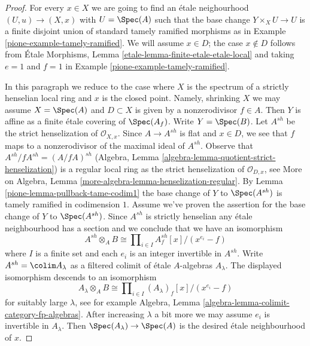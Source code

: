 \begin{proof}

For every $x \in X$ we are going to find an \'etale neighourhood
$(U, u) \to (X, x)$ with $U = \Spec(A)$ such that the base change
$Y \times_X U \to U$ is a finite disjoint union of standard tamely ramified
morphisms as in Example \ref{pione-example-tamely-ramified}.
We will assume $x \in D$; the case $x \not \in D$ follows from
\'Etale Morphisms, Lemma \ref{etale-lemma-finite-etale-etale-local}
and taking $e = 1$ and $f = 1$ in Example \ref{pione-example-tamely-ramified}.

\medskip\noindent
In this paragraph we reduce to the case where $X$ is the spectrum of a
strictly henselian local ring and $x$ is the closed point. Namely, shrinking
$X$ we may assume $X = \Spec(A)$ and $D \subset X$ is given by a
nonzerodivisor $f \in A$. Then $Y$ is affine as a finite
\'etale covering of $\Spec(A_f)$. Write $Y = \Spec(B)$.
Let $A^{sh}$ be the strict henselization of $\mathcal{O}_{X, x}$.
Since $A \to A^{sh}$ is flat and $x \in D$, we see that $f$ maps
to a nonzerodivisor of the maximal ideal of $A^{sh}$.
Observe that $A^{sh}/fA^{sh} = (A/fA)^{sh}$
(Algebra, Lemma \ref{algebra-lemma-quotient-strict-henselization})
is a regular local ring as the strict henselization of $\mathcal{O}_{D, x}$,
see More on Algebra, Lemma \ref{more-algebra-lemma-henselization-regular}.
By Lemma \ref{pione-lemma-pullback-tame-codim1}
the base change of $Y$ to $\Spec(A^{sh})$ is tamely ramified in
codimension $1$. Assume we've proven the assertion for the base change
of $Y$ to $\Spec(A^{sh})$. Since $A^{sh}$ is strictly henselian any
\'etale neighbourhood has a section and we conclude that we have an isomorphism
$$
A^{sh} \otimes_A B \cong
\prod\nolimits_{i \in I} A^{sh}_f[x]/(x^{e_i} - f)
$$
where $I$ is a finite set and each $e_i$ is an integer invertible in $A^{sh}$.
Write $A^{sh} = \colim A_\lambda$ as a filtered colimit of \'etale
$A$-algebras $A_\lambda$. The displayed isomorphism
descends to an isomorphism
$$
A_\lambda \otimes_A B \cong \prod\nolimits_{i \in I}
(A_\lambda)_f[x]/(x^{e_i} - f)
$$
for suitably large $\lambda$, see for example
Algebra, Lemma \ref{algebra-lemma-colimit-category-fp-algebras}.
After increasing $\lambda$ a bit
more we may assume $e_i$ is invertible in $A_\lambda$. Then
$\Spec(A_\lambda) \to \Spec(A)$ is the desired \'etale neighbourhood
of $x$.


\end{proof}
